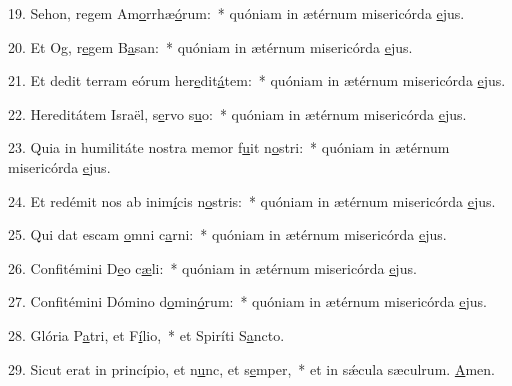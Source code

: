 19. Sehon, regem Am\uline{o}rrhæ\uline{ó}rum:~* quóniam in ætérnum misericórda \uline{e}jus.\par 
20. Et Og, r\uline{e}gem B\uline{a}san:~* quóniam in ætérnum misericórda \uline{e}jus.\par 
21. Et dedit terram eórum her\uline{e}dit\uline{á}tem:~* quóniam in ætérnum misericórda \uline{e}jus.\par 
22. Hereditátem Israël, s\uline{e}rvo s\uline{u}o:~* quóniam in ætérnum misericórda \uline{e}jus.\par 
23. Quia in humilitáte nostra memor f\uline{u}it n\uline{o}stri:~* quóniam in ætérnum misericórda \uline{e}jus.\par 
24. Et redémit nos ab inim\uline{í}cis n\uline{o}stris:~* quóniam in ætérnum misericórda \uline{e}jus.\par 
25. Qui dat escam \uline{o}mni c\uline{a}rni:~* quóniam in ætérnum misericórda \uline{e}jus.\par 
26. Confitémini D\uline{e}o c\uline{æ}li:~* quóniam in ætérnum misericórda \uline{e}jus.\par 
27. Confitémini Dómino d\uline{o}min\uline{ó}rum:~* quóniam in ætérnum misericórda \uline{e}jus.\par 
28. Glória P\uline{a}tri, et F\uline{í}lio,~* et Spiríti S\uline{a}ncto.\par 
29. Sicut erat in princípio, et n\uline{u}nc, et s\uline{e}mper,~* et in sǽcula sæculrum. \uline{A}men.\par 
